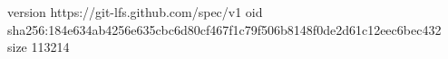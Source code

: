 version https://git-lfs.github.com/spec/v1
oid sha256:184e634ab4256e635cbc6d80cf467f1c79f506b8148f0de2d61c12eec6bec432
size 113214
